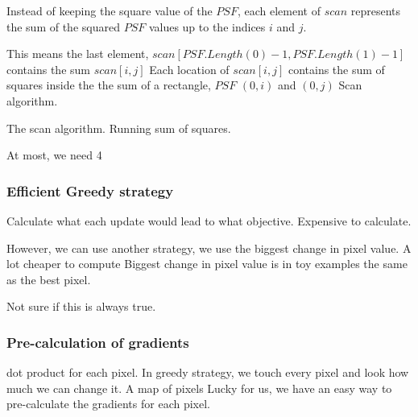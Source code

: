 Instead of keeping the square value of the $PSF$, each element of $scan$ represents the sum of the squared $PSF$ values up to the indices $i$ and $j$.

This means the last element,  $scan[PSF.Length(0) - 1, PSF.Length(1) -1]$ contains the sum  $scan[i, j]$
Each location of $scan[i, j]$ contains the sum of squares inside the the sum of a rectangle,  $PSF$ $(0, i)$ and $(0, j)$
Scan algorithm.

The scan algorithm. Running sum of squares.

At most, we need 4 


\subsubsection{Efficient Greedy strategy}

Calculate what each update would lead to what objective.
Expensive to calculate.

However, we can use another strategy, we use the biggest change in pixel value.
A lot cheaper to compute
Biggest change in pixel value is in toy examples the same as the best pixel. 

Not sure if this is always true.


\subsubsection{Pre-calculation of gradients}

dot product for each pixel.
In greedy strategy, we touch every pixel and look how much we can change it.
A map of pixels
Lucky for us, we have an easy way to pre-calculate the gradients for each pixel.


